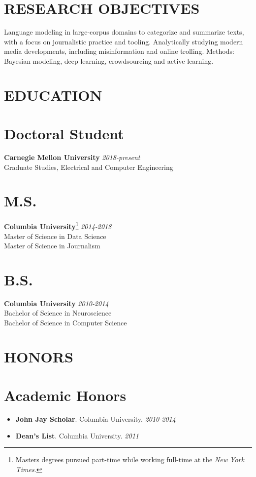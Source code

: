 \documentclass[margin]{res}
\newcommand{\fullhrulefill}{%
	\vspace{.7\baselineskip}
	\hspace*{-\sectionwidth}\hrulefill%
}
\begin{document}
\begin{resume}
\section{RESEARCH OBJECTIVES}
Language modeling in large-corpus domains to categorize and summarize texts, with a focus on journalistic practice and tooling.
Analytically studying modern media developments, including misinformation and online trolling. Methods: Bayesian modeling, deep learning, crowdsourcing and active learning.


\section{EDUCATION}
\fullhrulefill
\section{Doctoral Student}
{\bf Carnegie Mellon University}  \hfill {\sl 2018-present}\\
\-\hspace{.8cm} Graduate Studies, Electrical and Computer Engineering
\section{M.S.}
{\bf Columbia University}\footnote{Masters degrees pursued part-time while working full-time at the \textit{New York Times}.} \hfill {\sl2014-2018}\\
\-\hspace{.8cm} Master of Science in Data Science \\ 
\-\hspace{.8cm} Master of Science in Journalism
\section{B.S.}
{\bf Columbia University} \hfill {\sl2010-2014} \\
\-\hspace{.8cm} Bachelor of Science in Neuroscience\\
\-\hspace{.8cm} Bachelor of Science in Computer Science

\section{HONORS}
\fullhrulefill
\section{Academic Honors}
\begin{itemize}
	\item[] \textbf{John Jay Scholar}. Columbia University. \hfill \textit{2010-2014}
	\item[] \textbf{Dean's List}. Columbia University. \hfill \textit{2011}
\end{itemize}


\end{resume}
\end{document}
